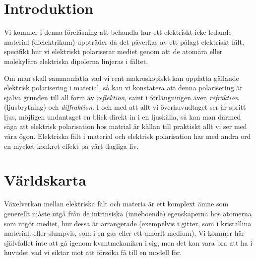 
\section{Introduktion}
Vi kommer i denna f{\"o}rel{\"a}sning att behandla hur ett elektriskt icke
ledande material (dielektrikum) upptr{\"a}der d{\aa} det
p{\aa}verkas av ett p{\aa}lagt elektriskt f{\"a}lt,  specifikt hur vi elektriskt polariserar mediet
genom att de atom{\"a}ra eller molekyl{\"a}ra elektriska dipolerna
 linjeras i f{\"a}ltet.

Om man skall sammanfatta vad vi rent makroskopiskt kan uppfatta g{\"a}llande
elektrisk polarisering i material, s{\aa} kan vi konstatera att denna
polarisering {\"a}r sj{\"a}lva grunden till all form av {\it reflektion},
samt i f{\"o}rl{\"a}ngningen {\"a}ven {\it refraktion} (ljusbrytning) och
{\it diffraktion}.
I och med att allt vi {\"o}verhuvudtaget ser {\"a}r spritt ljus, m{\"o}jligen
undantaget en blick direkt in i en ljusk{\"a}lla, s{\aa} kan man d{\"a}rmed
s{\"a}ga att elektrisk polarisation hos matrial {\"a}r k{\"a}llan till praktiskt
allt vi ser med v{\aa}ra {\"o}gon. Elektriska f{\"a}lt i material och elektrisk
polarisation har med andra ord en mycket konkret effekt p{\aa} v{\aa}rt dagliga
liv.

\section{V{\"a}rldskarta}
V{\"a}xelverkan mellan elektriska f{\"a}lt och materia {\"a}r ett komplext
{\"a}mne som generellt m{\aa}ste utg{\aa} fr{\aa}n de intrinsiska (inneboende)
egenskaperna hos atomerna som utg{\"o}r mediet, hur dessa {\"a}r arrangerade
(exempelvis i gitter, som i kristallina material, eller slumpvis, som i en gas
eller ett amorft medium).
Vi kommer h{\"a}r sj{\"a}lvfallet inte att g{\aa} igenom kvantmekaniken i sig,
men det kan vara bra att ha i huvudet vad vi siktar mot att f{\"o}rs{\"o}ka
f{\aa} till en modell f{\"o}r.

